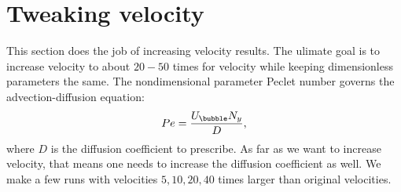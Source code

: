 \documentclass{article}
\newcommand{\beq}{\begin{equation}}
\newcommand{\feq}{\end{equation}}
\begin{document}
\section{Tweaking velocity}
This section does the job of increasing velocity results. The ulimate goal is to increase velocity
to about $20-50$ times for velocity while keeping dimensionless parameters the same. The
nondimensional parameter Peclet number governs the advection-diffusion equation:
\beq
Pe=\frac{U_{\bubble} N_y}{D},
\feq
where $D$ is the diffusion coefficient to prescribe. As far as we want to increase velocity, that
means one needs to increase the diffusion coefficient as well. We make a few runs with velocities
$5,10,20,40$ times larger than original velocities. 




\end{document}
